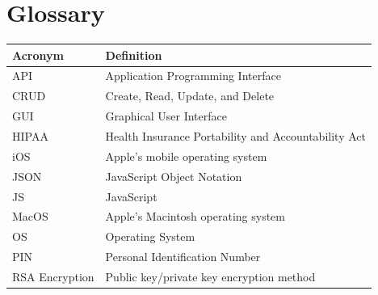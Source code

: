 \documentclass{article}
\begin{document}
\section{Glossary}
\begin{tabular}{|l|p{10cm}|}
\hline
\textbf{Acronym} & \textbf{Definition} \\ \hline
API & Application Programming Interface \\ \hline
CRUD & Create, Read, Update, and Delete \\ \hline
GUI & Graphical User Interface \\ \hline
HIPAA & Health Insurance Portability and Accountability Act \\ \hline
iOS & Apple’s mobile operating system \\ \hline
JSON & JavaScript Object Notation \\ \hline
JS & JavaScript \\ \hline
MacOS & Apple’s Macintosh operating system \\ \hline
OS & Operating System \\ \hline
PIN & Personal Identification Number \\ \hline
RSA Encryption & Public key/private key encryption method \\ \hline
\end{tabular}
\end{document}
